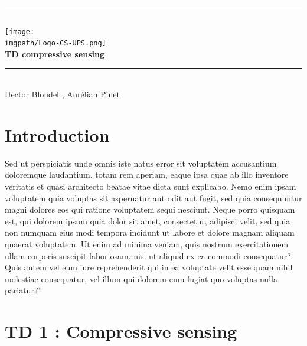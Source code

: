 \documentclass[a4paper, left=1cm, right=1cm, top=1cm, bottom=1cm,french]{article}
\begin{document}



\begin{center}




\rule{\linewidth}{0.5mm} \\[0.cm]
\texttt{[image: \\imgpath/Logo-CS-UPS.png]}\\[0.1cm]
{ \huge \bfseries TD compressive sensing \\[0.4cm] }
\rule{\linewidth}{0.5mm} \\[0.4cm]



Hector Blondel 
, Aurélian Pinet
\\[0.5cm]

\end{center}




\hypertarget{introduction}{%
\section{Introduction}\label{introduction}}

Sed ut perspiciatis unde omnis iste natus error sit voluptatem
accusantium doloremque laudantium, totam rem aperiam, eaque ipsa quae ab
illo inventore veritatis et quasi architecto beatae vitae dicta sunt
explicabo. Nemo enim ipsam voluptatem quia voluptas sit aspernatur aut
odit aut fugit, sed quia consequuntur magni dolores eos qui ratione
voluptatem sequi nesciunt. Neque porro quisquam est, qui dolorem ipsum
quia dolor sit amet, consectetur, adipisci velit, sed quia non numquam
eius modi tempora incidunt ut labore et dolore magnam aliquam quaerat
voluptatem. Ut enim ad minima veniam, quis nostrum exercitationem ullam
corporis suscipit laboriosam, nisi ut aliquid ex ea commodi consequatur?
Quis autem vel eum iure reprehenderit qui in ea voluptate velit esse
quam nihil molestiae consequatur, vel illum qui dolorem eum fugiat quo
voluptas nulla pariatur?''

\hypertarget{td-1-compressive-sensing}{%
\section{TD 1 : Compressive sensing}\label{td-1-compressive-sensing}}
\end{document}
